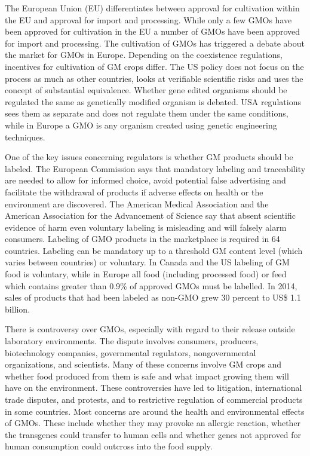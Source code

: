 The European Union (EU) differentiates between approval for cultivation within the EU and approval for import and processing. While only a few GMOs have been approved for cultivation in the EU a number of GMOs have been approved for import and processing. The cultivation of GMOs has triggered a debate about the market for GMOs in Europe. Depending on the coexistence regulations, incentives for cultivation of GM crops differ. The US policy does not focus on the process as much as other countries, looks at verifiable scientific risks and uses the concept of substantial equivalence. Whether gene edited organisms should be regulated the same as genetically modified organism is debated. USA regulations sees them as separate and does not regulate them under the same conditions, while in Europe a GMO is any organism created using genetic engineering techniques.

One of the key issues concerning regulators is whether GM products should be labeled. The European Commission says that mandatory labeling and traceability are needed to allow for informed choice, avoid potential false advertising and facilitate the withdrawal of products if adverse effects on health or the environment are discovered. The American Medical Association and the American Association for the Advancement of Science say that absent scientific evidence of harm even voluntary labeling is misleading and will falsely alarm consumers. Labeling of GMO products in the marketplace is required in 64 countries. Labeling can be mandatory up to a threshold GM content level (which varies between countries) or voluntary. In Canada and the US labeling of GM food is voluntary, while in Europe all food (including processed food) or feed which contains greater than 0.9\% of approved GMOs must be labelled. In 2014, sales of products that had been labeled as non-GMO grew 30 percent to US\$ 1.1 billion.

There is controversy over GMOs, especially with regard to their release outside laboratory environments. The dispute involves consumers, producers, biotechnology companies, governmental regulators, nongovernmental organizations, and scientists. Many of these concerns involve GM crops and whether food produced from them is safe and what impact growing them will have on the environment. These controversies have led to litigation, international trade disputes, and protests, and to restrictive regulation of commercial products in some countries. Most concerns are around the health and environmental effects of GMOs. These include whether they may provoke an allergic reaction, whether the transgenes could transfer to human cells and whether genes not approved for human consumption could outcross into the food supply.

